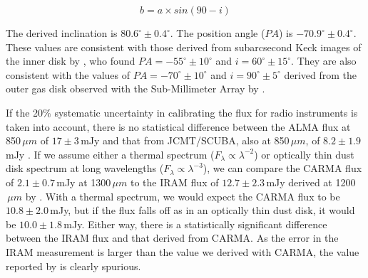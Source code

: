 \begin{equation}
b = a \times sin (90 - i)
\end{equation}

The derived inclination is $80.6^{\circ} \pm 0.4^{\circ}$. The position angle ($PA$) is $-70.9^{\circ} \pm 0.4^{\circ}$. These values are consistent with those derived from subarcsecond Keck images of the inner disk by \cite{Wahh07}, who found $PA = -55^{\circ} \pm 10^{\circ}$ and $i = 60^{\circ} \pm 15^{\circ}$. They are also consistent with the values of $PA = -70^{\circ} \pm 10^{\circ}$ and $i = 90^{\circ} \pm 5^{\circ}$ derived from the outer gas disk observed with the Sub-Millimeter Array by \cite{Hugh08}.

If the 20$\%$ systematic uncertainty in calibrating the flux for radio instruments is taken into account, there is no statistical difference between the ALMA flux at 850$\,\mu m$ of $17 \pm 3$\,mJy and that from JCMT/SCUBA, also at 850$\,\mu m$, of $8.2 \pm 1.9$\,mJy \citep{Song04}. If we assume either a thermal spectrum ($F_{\lambda} \propto \lambda^{-2}$) or optically thin dust disk spectrum at long wavelengths ($F_{\lambda} \propto \lambda^{-3}$), we can compare the CARMA flux of $2.1 \pm 0.7$\,mJy at 1300$\,\mu m$ to the IRAM flux of $12.7 \pm 2.3$\,mJy derived at 1200$\,\mu m$ by \cite{Bock94}. With a thermal spectrum, we would expect the CARMA flux to be $10.8 \pm 2.0$\,mJy, but if the flux falls off as in an optically thin dust disk, it would be $10.0 \pm 1.8$\,mJy. Either way, there is a statistically significant difference between the IRAM flux and that derived from CARMA. As the error in the IRAM measurement is larger than the value we derived with CARMA, the value reported by \citeauthor{Bock94} is clearly spurious. %

